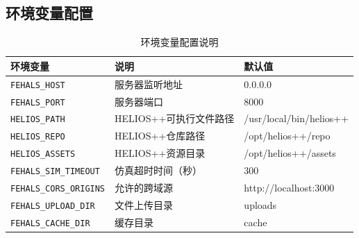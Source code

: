 \documentclass[a4paper,fleqn]{cas-sc}
\begin{document}
\subsection{环境变量配置}
\begin{table}[pos=!htbp]
    \centering
    \caption{环境变量配置说明}
    \label{tab:env-config}
    \begin{tabular}{@{} lll @{}}
        \toprule
        \textbf{环境变量}                  & \textbf{说明}     & \textbf{默认值}            \\
        \midrule
        \texttt{FEHALS\_HOST}          & 服务器监听地址         & 0.0.0.0                 \\
        \texttt{FEHALS\_PORT}          & 服务器端口           & 8000                    \\
        \texttt{HELIOS\_PATH}          & HELIOS++可执行文件路径 & /usr/local/bin/helios++ \\
        \texttt{HELIOS\_REPO}          & HELIOS++仓库路径    & /opt/helios++/repo      \\
        \texttt{HELIOS\_ASSETS}        & HELIOS++资源目录    & /opt/helios++/assets    \\
        \texttt{FEHALS\_SIM\_TIMEOUT}  & 仿真超时时间（秒）       & 300                     \\
        \texttt{FEHALS\_CORS\_ORIGINS} & 允许的跨域源          & http://localhost:3000   \\
        \texttt{FEHALS\_UPLOAD\_DIR}   & 文件上传目录          & uploads                 \\
        \texttt{FEHALS\_CACHE\_DIR}    & 缓存目录            & cache                   \\
        \bottomrule
    \end{tabular}
\end{table}
\end{document}
